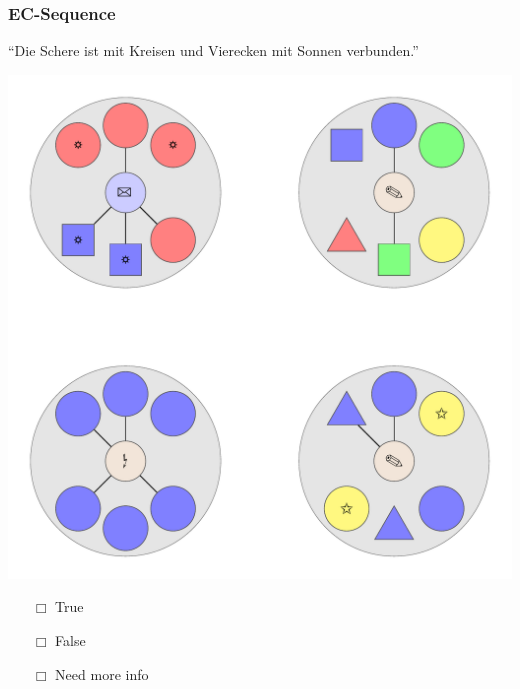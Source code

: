 \documentclass[fleqn,10pt,serif,xcolor=dvipsnames]{beamer}
\newcommand{\EC}{EC\xspace}
\newcommand{\mymark}[1]{{\color{blue}{#1}}}
\begin{document}
\begin{frame}
  \frametitle{\EC-Sequence}
  \begin{center}
    ``Die Schere ist mit Kreisen und Vierecken mit Sonnen verbunden.''

    \vspace{0.1cm}

    \includegraphics[width=0.5 \textwidth]{../../pictures/ec_01_5.pdf}

    \vspace{0.1cm}

    \begin{multicols}{3}
      \begin{itemize} 
      \item[$\Box$] True\\
        \onslide<2>{$\leadsto$  \mymark{LC}}
      \item[$\Box$] False\\
        \onslide<2>{$\leadsto$ \mymark{false}}
      \item[$\Box$] Need more info 
      \end{itemize}
    \end{multicols}

  \end{center}
\end{frame}
\end{document}
